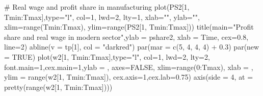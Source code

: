 \documentclass[
  letterpaper,
  DIV=11,
  numbers=noendperiod]{scrreprt}
\newenvironment{Shaded}{\begin{snugshade}}{\end{snugshade}}
\newcommand{\AttributeTok}[1]{\textcolor[rgb]{0.40,0.45,0.13}{#1}}
\newcommand{\CommentTok}[1]{\textcolor[rgb]{0.37,0.37,0.37}{#1}}
\newcommand{\ConstantTok}[1]{\textcolor[rgb]{0.56,0.35,0.01}{#1}}
\newcommand{\DecValTok}[1]{\textcolor[rgb]{0.68,0.00,0.00}{#1}}
\newcommand{\FloatTok}[1]{\textcolor[rgb]{0.68,0.00,0.00}{#1}}
\newcommand{\FunctionTok}[1]{\textcolor[rgb]{0.28,0.35,0.67}{#1}}
\newcommand{\NormalTok}[1]{\textcolor[rgb]{0.00,0.23,0.31}{#1}}
\newcommand{\SpecialCharTok}[1]{\textcolor[rgb]{0.37,0.37,0.37}{#1}}
\newcommand{\StringTok}[1]{\textcolor[rgb]{0.13,0.47,0.30}{#1}}
\begin{document}
\begin{Shaded}
\begin{Highlighting}[]
\CommentTok{\# Real wage and profit share in manufacturing}
\FunctionTok{plot}\NormalTok{(PS2[}\DecValTok{1}\NormalTok{, Tmin}\SpecialCharTok{:}\NormalTok{Tmax],}\AttributeTok{type=}\StringTok{"l"}\NormalTok{, }\AttributeTok{col=}\DecValTok{1}\NormalTok{, }\AttributeTok{lwd=}\DecValTok{2}\NormalTok{, }\AttributeTok{lty=}\DecValTok{1}\NormalTok{, }\AttributeTok{xlab=}\StringTok{""}\NormalTok{, }\AttributeTok{ylab=}\StringTok{""}\NormalTok{, }\AttributeTok{xlim=}\FunctionTok{range}\NormalTok{(Tmin}\SpecialCharTok{:}\NormalTok{Tmax), }\AttributeTok{ylim=}\FunctionTok{range}\NormalTok{(PS2[}\DecValTok{1}\NormalTok{, Tmin}\SpecialCharTok{:}\NormalTok{Tmax])) }
\FunctionTok{title}\NormalTok{(}\AttributeTok{main=}\StringTok{"Profit share and real wage in modern sector"}\NormalTok{,}\AttributeTok{ylab =} \StringTok{\textquotesingle{}pshare2\textquotesingle{}}\NormalTok{, }\AttributeTok{xlab =} \StringTok{\textquotesingle{}Time\textquotesingle{}}\NormalTok{, }\AttributeTok{cex=}\FloatTok{0.8}\NormalTok{, }\AttributeTok{line=}\DecValTok{2}\NormalTok{)}
\FunctionTok{abline}\NormalTok{(}\AttributeTok{v =}\NormalTok{ tp[}\DecValTok{1}\NormalTok{], }\AttributeTok{col =} \StringTok{"darkred"}\NormalTok{)}
\FunctionTok{par}\NormalTok{(}\AttributeTok{mar =} \FunctionTok{c}\NormalTok{(}\DecValTok{5}\NormalTok{, }\DecValTok{4}\NormalTok{, }\DecValTok{4}\NormalTok{, }\DecValTok{4}\NormalTok{) }\SpecialCharTok{+} \FloatTok{0.3}\NormalTok{)}
\FunctionTok{par}\NormalTok{(}\AttributeTok{new =} \ConstantTok{TRUE}\NormalTok{)}
\FunctionTok{plot}\NormalTok{(w2[}\DecValTok{1}\NormalTok{, Tmin}\SpecialCharTok{:}\NormalTok{Tmax],}\AttributeTok{type=}\StringTok{"l"}\NormalTok{, }\AttributeTok{col=}\DecValTok{1}\NormalTok{, }\AttributeTok{lwd=}\DecValTok{2}\NormalTok{, }\AttributeTok{lty=}\DecValTok{2}\NormalTok{, }\AttributeTok{font.main=}\DecValTok{1}\NormalTok{,}\AttributeTok{cex.main=}\DecValTok{1}\NormalTok{,}\AttributeTok{ylab =} \StringTok{\textquotesingle{}\textquotesingle{}}\NormalTok{, }\AttributeTok{axes=}\ConstantTok{FALSE}\NormalTok{, }\AttributeTok{xlim=}\FunctionTok{range}\NormalTok{(}\DecValTok{0}\SpecialCharTok{:}\NormalTok{Tmax),}
     \AttributeTok{xlab =} \StringTok{\textquotesingle{}\textquotesingle{}}\NormalTok{, }\AttributeTok{ylim =} \FunctionTok{range}\NormalTok{(w2[}\DecValTok{1}\NormalTok{, Tmin}\SpecialCharTok{:}\NormalTok{Tmax]), }\AttributeTok{cex.axis=}\DecValTok{1}\NormalTok{,}\AttributeTok{cex.lab=}\FloatTok{0.75}\NormalTok{)}
\FunctionTok{axis}\NormalTok{(}\AttributeTok{side =} \DecValTok{4}\NormalTok{, }\AttributeTok{at =} \FunctionTok{pretty}\NormalTok{(}\FunctionTok{range}\NormalTok{(w2[}\DecValTok{1}\NormalTok{, Tmin}\SpecialCharTok{:}\NormalTok{Tmax])))  }

\end{Highlighting}
\end{Shaded}
\end{document}

